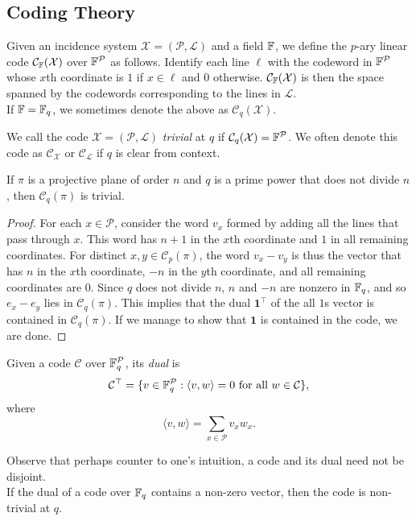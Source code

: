 \subsection{Coding Theory}

	\begin{fdef}
		Given an incidence system $\mathcal{X} = (\mathcal{P},\mathcal{L})$ and a field $\mathbb{F}$, we define the $p$-ary linear code $\mathcal{C}_{\mathbb{F}}(\mathcal{X})$ over $\mathbb{F}^\mathcal{P}$ as follows. Identify each line $\ell$ with the codeword in $\mathbb{F}^{\mathcal{P}}$ whose $x$th coordinate is $1$ if $x \in \ell$ and $0$ otherwise. $\mathcal{C}_{\mathbb{F}}(\mathcal{X})$ is then the space spanned by the codewords corresponding to the lines in $\mathcal{L}$.\\
		If $\mathbb{F} = \mathbb{F}_q$, we sometimes denote the above as $\mathcal{C}_q(\mathcal{X})$.
	\end{fdef}

	We call the code $\mathcal{X} = (\mathcal{P},\mathcal{L})$ \emph{trivial} at $q$ if $\mathcal{C}_q(\mathcal{X}) = \mathbb{F}^\mathcal{P}$. We often denote this code as $\mathcal{C}_\mathcal{X}$ or $\mathcal{C}_\mathcal{L}$ if $q$ is clear from context.

	\begin{ftheo}
		If $\pi$ is a projective plane of order $n$ and $q$ is a prime power that does not divide $n$, then $\mathcal{C}_q(\pi)$ is trivial.
	\end{ftheo}
	\begin{proof}
		For each $x \in \mathcal{P}$, consider the word $v_x$ formed by adding all the lines that pass through $x$. This word has $n+1$ in the $x$th coordinate and $1$ in all remaining coordinates. For distinct $x,y \in \mathcal{C}_p(\pi)$, the word $v_x - v_y$ is thus the vector that has $n$ in the $x$th coordinate, $-n$ in the $y$th coordinate, and all remaining coordinates are $0$. Since $q$ does not divide $n$, $n$ and $-n$ are nonzero in $\mathbb{F}_q$, and so $e_x - e_y$ lies in $\mathcal{C}_q(\pi)$. This implies that the dual $\textbf{1}^\top$ of the all $1$s vector is contained in $\mathcal{C}_q(\pi)$. If we manage to show that $\textbf{1}$ is contained in the code, we are done. 
	\end{proof}

	\begin{fdef}[Dual]
		Given a code $\mathcal{C}$ over $\mathbb{F}_q^\mathcal{P}$, its \emph{dual} is
		\[ \mathcal{C}^\top = \{ v \in \mathbb{F}_q^\mathcal{P} : \langle v,w\rangle = 0 \text{ for all }w\in\mathcal{C} \}, \]
		where
		\[ \langle v , w \rangle = \sum_{x \in \mathcal{P}} v_x w_x.  \]
	\end{fdef}
	Observe that perhaps counter to one's intuition, a code and its dual need not be disjoint.\\
	If the dual of a code over $\mathbb{F}_q$ contains a non-zero vector, then the code is non-trivial at $q$.\\

